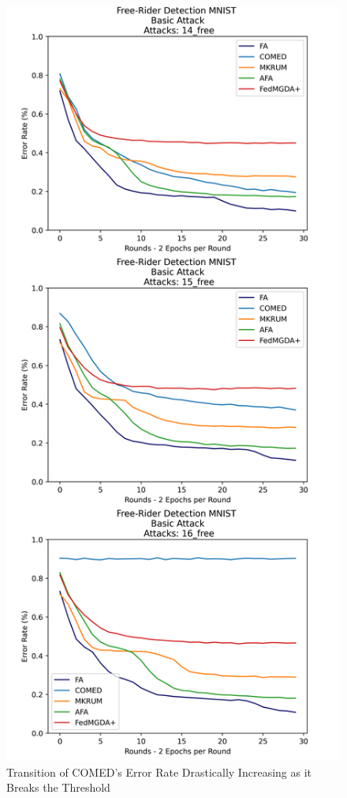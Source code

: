 \begin{figure}[htbp]
	\centering
    \includegraphics[scale=0.1]{free_riders/graphs/comed_broken.png}
	\caption{Transition of COMED's Error Rate Drastically Increasing as it Breaks the Threshold}
	\label{fig:comed_broken}
\end{figure}